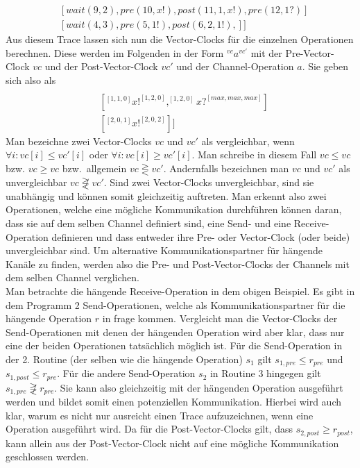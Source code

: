 \begin{align}
  [&[signal(1, 2), signale(2, 3), pre(1, x?), post(7, 1, x?, 6), pre(8, x?), post(13, 1, x?, 11)]\\
  &[wait(9, 2), pre(10, x!), post(11, 1, x!), pre(12, 1?)]\\
  &[wait(4, 3), pre(5, 1!), post(6, 2, 1!),]
  ]
\end{align}
Aus diesem Trace lassen sich nun die Vector-Clocks für die einzelnen Operationen berechnen.
Diese werden im Folgenden in der Form $^{vc}a^{vc'}$ mit der Pre-Vector-Clock $vc$ und der 
Post-Vector-Clock $vc'$ und der Channel-Operation $a$. Sie geben sich also als
\begin{align*}
  [&[^{[2,0,0]}x?^{[3,0,2]}, ^{[3,0,2]}x?^{[4,2,2]}]\\
  &[^{[1, 1, 0]}x!^{[1, 2, 0]}, ^{[1, 2, 0]}x?^{[max, max, max]}]\\
  &[^{[2, 0, 1]}x!^{[2, 0, 2]}]]
\end{align*}
Man bezeichne zwei Vector-Clocks $vc$ und $vc'$ als vergleichbar, wenn
$\forall i: vc[i] \leq vc'[i]$ oder $\forall i: vc[i] \geq vc'[i]$. Man 
schreibe in diesem Fall $vc \leq vc$ bzw. $vc \geq vc$ bzw.~allgemein 
$vc \gtreqless vc'$. Andernfalls 
bezeichnen man $vc$ und $vc'$ als unvergleichbar $vc \not\gtreqless vc'$. 
Sind zwei Vector-Clocks 
unvergleichbar, sind sie unabhängig und können somit gleichzeitig auftreten. 
Man erkennt also zwei Operationen, welche eine mögliche Kommunikation durchführen 
können daran, dass sie auf dem selben Channel definiert sind, eine Send-
und eine Receive-Operation definieren und dass 
entweder ihre Pre- oder Vector-Clock (oder beide) unvergleichbar sind.
Um alternative Kommunikationspartner für hängende Kanäle zu finden, werden also
die Pre- und Post-Vector-Clocks der Channels mit dem selben Channel verglichen.\\
Man betrachte die hängende Receive-Operation in dem obigen Beispiel. Es gibt 
in dem Programm 2 Send-Operationen, welche als Kommunikationspartner für 
die hängende Operation $r$ in frage kommen. Vergleicht man die Vector-Clocks der 
Send-Operationen mit denen der hängenden Operation wird aber klar, dass nur 
eine der beiden Operationen tatsächlich möglich ist. Für die Send-Operation 
in der 2. Routine (der selben wie die hängende Operation) $s_1$ gilt 
$s_{1, pre} \leq r_{pre}$ und $s_{1, post} \leq r_{pre}$.  
Für die andere Send-Operation $s_2$ in Routine 3 hingegen gilt 
$s_{1, pre} \not\gtreqless r_{pre}$. Sie kann also gleichzeitig mit der 
hängenden Operation ausgeführt werden und bildet somit einen potenziellen 
Kommunikation. Hierbei wird auch klar, warum es nicht nur ausreicht einen 
Trace aufzuzeichnen, wenn eine Operation ausgeführt wird. Da für die 
Post-Vector-Clocks gilt, dass $s_{2, post} \geq r_{post}$, kann allein aus der 
Post-Vector-Clock nicht auf eine mögliche Kommunikation geschlossen werden.

